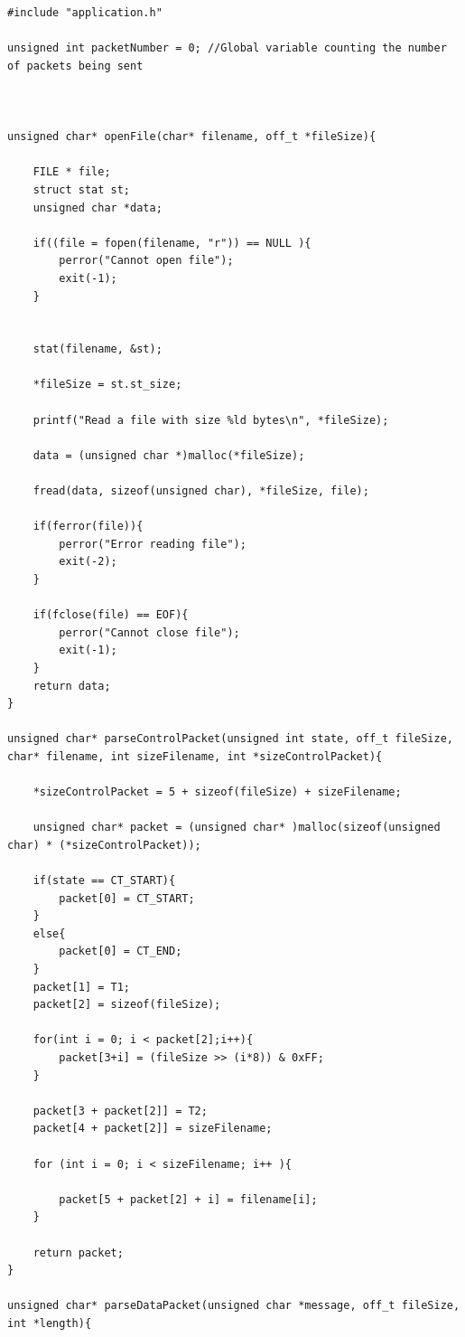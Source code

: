 \documentclass[11pt]{article}
\begin{document}
\begin{lstlisting}[style=CStyle]
#include "application.h"

unsigned int packetNumber = 0; //Global variable counting the number of packets being sent



unsigned char* openFile(char* filename, off_t *fileSize){

    FILE * file;
    struct stat st;
    unsigned char *data;
    
    if((file = fopen(filename, "r")) == NULL ){
        perror("Cannot open file");
        exit(-1);
    }


    stat(filename, &st);
    
    *fileSize = st.st_size;

    printf("Read a file with size %ld bytes\n", *fileSize);

    data = (unsigned char *)malloc(*fileSize);

    fread(data, sizeof(unsigned char), *fileSize, file);

    if(ferror(file)){
        perror("Error reading file");
        exit(-2);
    }

    if(fclose(file) == EOF){
        perror("Cannot close file");
        exit(-1);
    }
    return data;
}

unsigned char* parseControlPacket(unsigned int state, off_t fileSize, char* filename, int sizeFilename, int *sizeControlPacket){
    
    *sizeControlPacket = 5 + sizeof(fileSize) + sizeFilename;

    unsigned char* packet = (unsigned char* )malloc(sizeof(unsigned char) * (*sizeControlPacket));

    if(state == CT_START){
        packet[0] = CT_START;
    }
    else{
        packet[0] = CT_END;
    }
    packet[1] = T1;
    packet[2] = sizeof(fileSize);
    
    for(int i = 0; i < packet[2];i++){
        packet[3+i] = (fileSize >> (i*8)) & 0xFF;
    }

    packet[3 + packet[2]] = T2;
    packet[4 + packet[2]] = sizeFilename;

    for (int i = 0; i < sizeFilename; i++ ){
        
        packet[5 + packet[2] + i] = filename[i];
    }

    return packet;
}

unsigned char* parseDataPacket(unsigned char *message, off_t fileSize, int *length){
    

\end{lstlisting}
\end{document}
